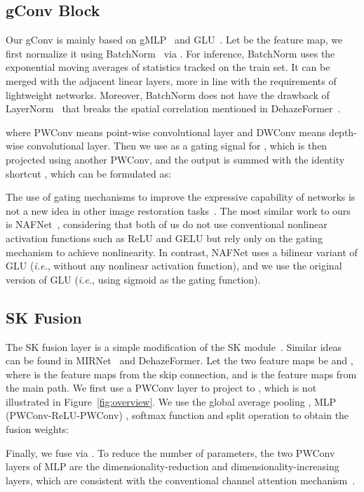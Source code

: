 \documentclass[10pt,twocolumn,letterpaper]{article}
\begin{document}
\subsection{gConv Block}
Our gConv is mainly based on gMLP~\cite{liu2021pay} and GLU~\cite{dauphin2017language,shazeer2020glu}.
Let  be the feature map, we first normalize it using BatchNorm~\cite{ioffe2015batch} via .
For inference, BatchNorm uses the exponential moving averages of statistics tracked on the train set. 
It can be merged with the adjacent linear layers, more in line with the requirements of lightweight networks.
Moreover, BatchNorm does not have the drawback of LayerNorm~\cite{ba2016layer} that breaks the spatial correlation mentioned in DehazeFormer~\cite{song2022vision}.

where PWConv means point-wise convolutional layer and DWConv means depth-wise convolutional layer.
Then we use  as a gating signal for , which is then projected using another PWConv, and the output is summed with the identity shortcut , which can be formulated as:


The use of gating mechanisms to improve the expressive capability of networks is not a new idea in other image restoration tasks~\cite{zamir2021restormer,tu2022maxim,chen2022simple}.
The most similar work to ours is NAFNet~\cite{chen2022simple}, considering that both of us do not use conventional nonlinear activation functions such as ReLU and GELU but rely only on the gating mechanism to achieve nonlinearity.
In contrast, NAFNet uses a bilinear variant of GLU (\emph{i.e.}, without any nonlinear activation function), and we use the original version of GLU (\emph{i.e.}, using sigmoid as the gating function).

\subsection{SK Fusion}

The SK fusion layer is a simple modification of the SK module~\cite{li2019selective}.
Similar ideas can be found in MIRNet~\cite{zamir2020mirnet,zamir2022learning} and DehazeFormer.
Let the two feature maps be  and , where  is the feature maps from the skip connection, and  is the feature maps from the main path.
We first use a PWConv layer  to project  to , which is not illustrated in Figure~\ref{fig:overview}.
We use the global average pooling , MLP (PWConv-ReLU-PWConv) , softmax function and split operation to obtain the fusion weights:

Finally, we fuse  via .
To reduce the number of parameters, the two PWConv layers of MLP are the dimensionality-reduction and dimensionality-increasing layers, which are consistent with the conventional channel attention mechanism~\cite{hu2018squeeze}.
\end{document}
